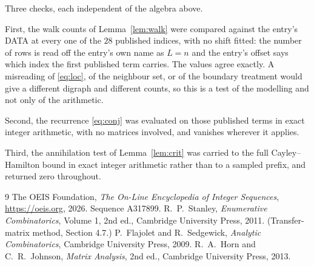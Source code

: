 \documentclass[11pt,a4paper]{article}
\theoremstyle{plain}
\theoremstyle{definition}
\begin{document}
Three checks, each independent of the algebra above.

First, the walk counts of Lemma~\ref{lem:walk} were compared against the entry's DATA at
every one of the $28$ published indices, with no shift fitted: the number of rows is
read off the entry's own name as $L=n$ and the entry's offset says which index the first
published term carries. The values agree exactly. A misreading of \eqref{eq:loc}, of the
neighbour set, or of the boundary treatment would give a different digraph and different
counts, so this is a test of the modelling and not only of the arithmetic.

Second, the recurrence \eqref{eq:conj} was evaluated on those published terms in exact
integer arithmetic, with no matrices involved, and vanishes wherever it applies.

Third, the annihilation test of Lemma~\ref{lem:crit} was carried to the full
Cayley--Hamilton bound in exact integer arithmetic rather than to a sampled prefix, and
returned zero throughout.

\begin{thebibliography}{9}
 The OEIS Foundation, \emph{The On-Line Encyclopedia of Integer
Sequences}, \url{https://oeis.org}, 2026. Sequence A317899.
 R.~P.~Stanley, \emph{Enumerative Combinatorics}, Volume 1, 2nd ed.,
Cambridge University Press, 2011. (Transfer-matrix method, Section 4.7.)
 P.~Flajolet and R.~Sedgewick, \emph{Analytic Combinatorics}, Cambridge
University Press, 2009.
 R.~A.~Horn and C.~R.~Johnson, \emph{Matrix Analysis}, 2nd ed., Cambridge
University Press, 2013.
\end{thebibliography}
\end{document}
